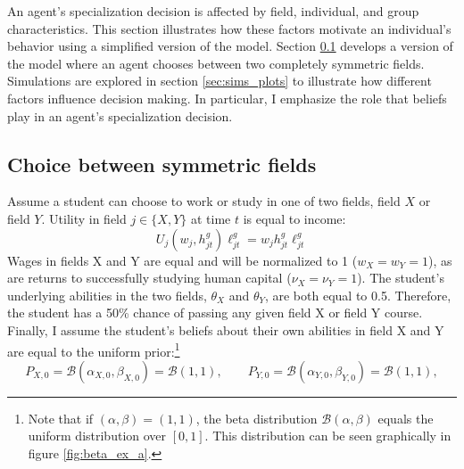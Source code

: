 An agent's specialization decision is affected by field, individual, and group characteristics.
This section illustrates how these factors motivate an individual's behavior using a simplified version of the model.
Section \ref{sec:sims_prelims} develops a version of the model where an agent chooses between two completely symmetric fields. 
Simulations are explored in section \ref{sec:sims_plots} to illustrate how different factors influence decision making.
In particular, I emphasize the role that beliefs play in an agent's specialization decision. 

\subsection{Choice between symmetric fields}\label{sec:sims_prelims}


Assume a student can choose to work or study in one of two fields, field $X$ or field $Y$. 
Utility in field $j \in \{X, Y\}$ at time $t$ is equal to income: 
\begin{equation}\label{eq:linear_utility}
    U_j(w_j, h_{jt}^g) \ell_{jt}^g = w_j h_{jt}^g \ell_{jt}^g
\end{equation}
Wages in fields X and Y are equal and will be normalized to 1 ($w_X = w_Y = 1$), as are returns to successfully studying human capital ($\nu_X = \nu_Y = 1$).
The student's underlying abilities in the two fields, $\theta_X$ and $\theta_Y$, are both equal to 0.5. Therefore, the student has a 50\% chance of passing any given field X or field Y course.
Finally, I assume the student's beliefs about their own abilities in field X and Y are equal to the uniform prior:\footnote{
    Note that if $(\alpha, \beta) = (1, 1)$, the beta distribution $\mathcal{B} (\alpha, \beta)$ equals the uniform distribution over $[0, 1]$. This distribution can be seen graphically in figure \ref{fig:beta_ex_a}.
}
\begin{equation*}
    P_{X,0} = \mathcal{B}(\alpha_{X, 0}, \beta_{X, 0}) = \mathcal{B} (1, 1), 
    \quad \quad 
    P_{Y,0} = \mathcal{B}(\alpha_{Y, 0}, \beta_{Y, 0}) = \mathcal{B} (1, 1), 
\end{equation*}

